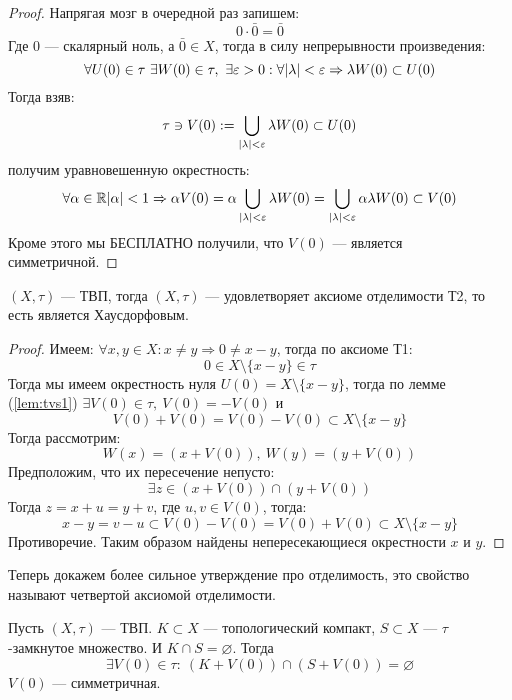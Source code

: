 {\begin{proof}
	Напрягая мозг в очередной раз запишем:
	$$
	0 \cdot \bar{0} = \bar{0} 
	$$
	Где $0$ --- скалярный ноль, а $\bar{0} \in X$, тогда в силу непрерывности произведения: 
	$$
	\forall U(0) \in \tau \ \exists W(0) \in \tau, \ \exists \eps > 0: \forall |\lambda| < \eps \Rightarrow \lambda W(0) \subset U(0)
	$$
	Тогда взяв:
	$$
	\tau \ni V(0) : = \bigcup_{|\lambda| < \varepsilon} \lambda W(0) \subset U(0)
	$$
получим уравновешенную окрестность: 
	$$
	\forall \alpha \in \mathbb{R} |\alpha| < 1 \Rightarrow \alpha V(0) = \alpha \bigcup_{|\lambda| < \varepsilon}\lambda W(0) = \bigcup_{|\lambda| < \varepsilon}\alpha\lambda W(0) \subset V(0)
	$$
	Кроме этого мы БЕСПЛАТНО получили, что $V(0)$ --- является симметричной. 
\end{proof}

\begin{claim}
	$(X, \tau)$ --- ТВП, тогда $(X, \tau)$ --- удовлетворяет аксиоме отделимости Т2, то есть является Хаусдорфовым.
\end{claim}

\begin{proof}
	Имеем: $\forall x,y \in X: x \neq y \Rightarrow 0 \neq x - y$, тогда по аксиоме Т1: 
	$$
	0 \in X \setminus \{x - y\} \in \tau
	$$
	Тогда мы имеем окрестность нуля $U(0) = X \setminus \{x - y\}$, тогда по лемме (\ref{lem:tvs1}) $\exists V(0) \in \tau, \ V(0) = -V(0)$ и 
	$$
	V(0) + V(0) = V(0) - V(0) \subset X \setminus \{x - y\}
	$$
	Тогда рассмотрим: 
	$$
	W(x) = (x + V(0)), \ W(y) = (y + V(0))
	$$
	Предположим, что их пересечение непусто: 
	$$
	\exists z \in (x + V(0)) \cap (y + V(0))
	$$
	Тогда $z = x + u = y + v$, где $u,v \in V(0)$, тогда:
	$$
	x - y = v - u \subset V(0) - V(0) = V(0) +  V(0) \subset X \setminus \{x - y\}
	$$
	Противоречие. Таким образом найдены непересекающиеся окрестности $x$ и $y$.
\end{proof}

Теперь докажем более сильное утверждение про отделимость, это свойство называют четвертой аксиомой отделимости. 
\begin{claim}
	Пусть $(X, \tau)$ --- ТВП. $K \subset X$ --- топологический компакт, $S \subset X$ --- $\tau$-замкнутое множество. И $K \cap S = \varnothing$. Тогда 
	$$
	\exists V(0)  \in \tau: \ (K + V(0))\cap (S + V(0)) = \varnothing
	$$
	$V(0)$ --- симметричная.
\end{claim}

}
